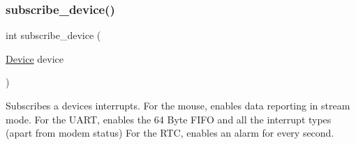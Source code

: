 \subsubsection{\texorpdfstring{subscribe\+\_\+device()}{subscribe\_device()}}
{\footnotesize\ttfamily int subscribe\+\_\+device (\begin{DoxyParamCaption}\item[{\mbox{\hyperlink{group__interrupts_gadb53a8cc97236ca207c035241a5b7fb8}{Device}}}]{device }\end{DoxyParamCaption})}



Subscribes a device\textquotesingle{}s interrupts. For the mouse, enables data reporting in stream mode. For the U\+A\+RT, enables the 64 Byte F\+I\+FO and all the interrupt types (apart from modem status) For the R\+TC, enables an alarm for every second. 


